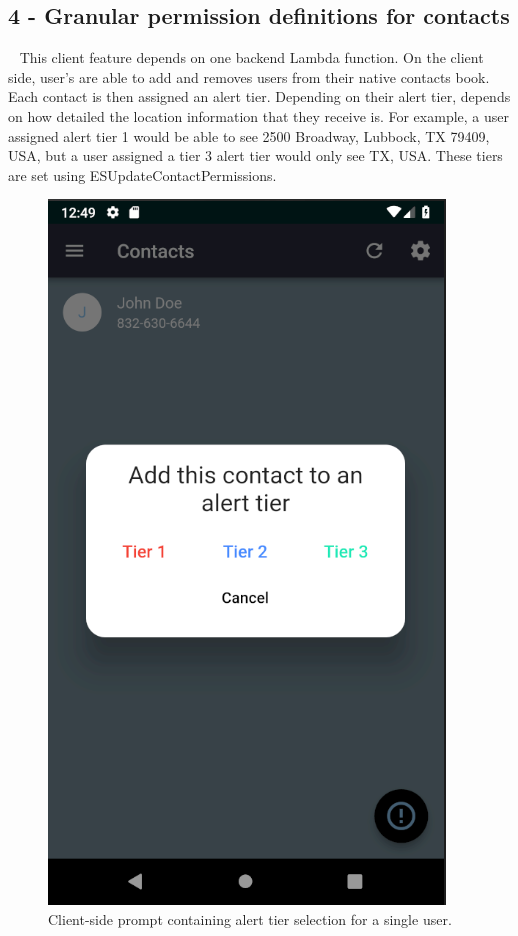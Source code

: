 \documentclass[10pt, a4paper]{article}
\begin{document}
\subsection{4 - Granular permission definitions for contacts}
\par ~ This client feature depends on one backend Lambda function. On the client side, user's are able to add and removes users from their native contacts book. Each contact is then assigned an alert tier. Depending on their alert tier, depends on how detailed the location information that they receive is. For example, a user assigned alert tier 1 would be able to see  2500 Broadway, Lubbock, TX 79409, USA, but a user assigned a tier 3 alert tier would only see TX, USA. These tiers are set using ESUpdateContactPermissions.

\begin{figure}[H]
  \centerline{
  	\includegraphics[scale=.8]{img/alert-tier.PNG}
  }  
  \caption{Client-side prompt containing alert tier selection for a single user.}
\end{figure}
\end{document}
